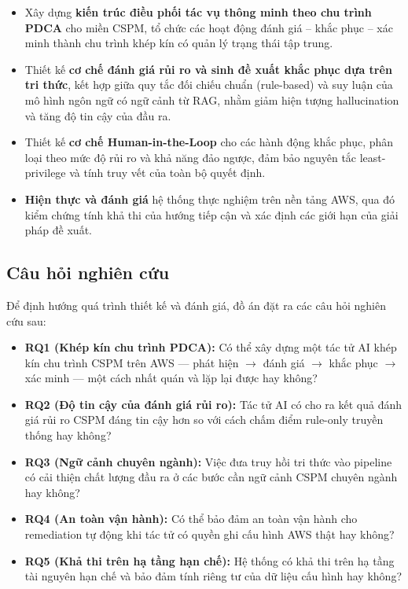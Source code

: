 \begin{itemize}
    \item Xây dựng \textbf{kiến trúc điều phối tác vụ thông minh theo chu trình PDCA} cho miền CSPM, tổ chức các hoạt động đánh giá – khắc phục – xác minh thành chu trình khép kín có quản lý trạng thái tập trung.

    \item Thiết kế \textbf{cơ chế đánh giá rủi ro và sinh đề xuất khắc phục dựa trên tri thức}, kết hợp giữa quy tắc đối chiếu chuẩn (rule-based) và suy luận của mô hình ngôn ngữ có ngữ cảnh từ RAG, nhằm giảm hiện tượng hallucination và tăng độ tin cậy của đầu ra.

    \item Thiết kế \textbf{cơ chế Human-in-the-Loop} cho các hành động khắc phục, phân loại theo mức độ rủi ro và khả năng đảo ngược, đảm bảo nguyên tắc least-privilege và tính truy vết của toàn bộ quyết định.

    \item \textbf{Hiện thực và đánh giá} hệ thống thực nghiệm trên nền tảng AWS, qua đó kiểm chứng tính khả thi của hướng tiếp cận và xác định các giới hạn của giải pháp đề xuất.
\end{itemize}

\subsection*{Câu hỏi nghiên cứu}
\label{subsec:research-questions}

Để định hướng quá trình thiết kế và đánh giá, đồ án đặt ra các câu hỏi nghiên cứu sau:

\begin{itemize}
    \item \textbf{RQ1 (Khép kín chu trình PDCA):} Có thể xây dựng một tác tử AI khép kín chu trình CSPM trên AWS — phát hiện $\to$ đánh giá $\to$ khắc phục $\to$ xác minh — một cách nhất quán và lặp lại được hay không?

    \item \textbf{RQ2 (Độ tin cậy của đánh giá rủi ro):} Tác tử AI có cho ra kết quả đánh giá rủi ro CSPM đáng tin cậy hơn so với cách chấm điểm rule-only truyền thống hay không?

    \item \textbf{RQ3 (Ngữ cảnh chuyên ngành):} Việc đưa truy hồi tri thức vào pipeline có cải thiện chất lượng đầu ra ở các bước cần ngữ cảnh CSPM chuyên ngành hay không?

    \item \textbf{RQ4 (An toàn vận hành):} Có thể bảo đảm an toàn vận hành cho remediation tự động khi tác tử có quyền ghi cấu hình AWS thật hay không?

    \item \textbf{RQ5 (Khả thi trên hạ tầng hạn chế):} Hệ thống có khả thi trên hạ tầng tài nguyên hạn chế và bảo đảm tính riêng tư của dữ liệu cấu hình hay không?
\end{itemize}

